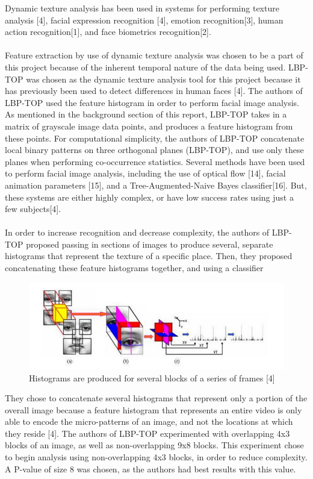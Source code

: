\documentclass[12pt,twoside]{report}
\begin{document}
Dynamic texture analysis has been used in systems for performing texture analysis [4], facial expression recognition [4], emotion recognition[3],  human action recognition[1], and face biometrics recognition[2]. 
\\ \\
Feature extraction by use of dynamic texture analysis was chosen to be a part of this project because of the inherent temporal nature of the data being used. LBP-TOP was chosen as the dynamic texture analysis tool for this project because it has previously been used to detect differences in human faces [4]. The authors of LBP-TOP used the feature histogram in order to perform facial image analysis. As mentioned in the background section of this report, LBP-TOP takes in a matrix of grayscale image data points, and produces a feature histogram from these points. For computational simplicity, the authors of LBP-TOP concatenate local binary patterns on three orthogonal planes (LBP-TOP), and use only these planes when performing co-occurrence statistics. Several methods have been used to perform facial image analysis, including the use of optical flow [14], facial animation parameters [15], and a Tree-Augmented-Naive Bayes classifier[16]. But, these systems are either highly complex, or have low success rates using just a few subjects[4]. 
\\ \\
In order to increase recognition and decrease complexity, the authors of LBP-TOP proposed passing in sections of images to produce several, separate histograms that represent the texture of a specific place. Then, they proposed concatenating these feature histograms together, and using a classifier 

\begin{figure}[tb]
\centering
\includegraphics[width = 0.8\hsize]{./figures/lbptopprocess1}
\caption{Histograms are produced for several blocks of a series of frames [4]}
\label{fig:avletters2}
\end{figure} 

They chose to concatenate several histograms that represent only a portion of the overall image because a feature histogram that represents an entire video is only able to encode the micro-patterns of an image, and not the locations at which they reside [4]. The authors of LBP-TOP experimented with overlapping 4x3 blocks of an image, as well as non-overlapping 9x8 blocks. This experiment chose to begin analysis using non-overlapping 4x3 blocks, in order to reduce complexity. A P-value of size 8 was chosen, as the authors had best results with this value. 
\end{document}
